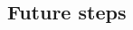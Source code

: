 \documentclass[letterpaper,12pt]{article}
\theoremstyle{definition}
\begin{document}
\begin{spacing}{1.5}
%
%
%
%
%
%
%
%
%
%
%
%
%

\section*{Future steps}


\end{spacing}
\end{document}
